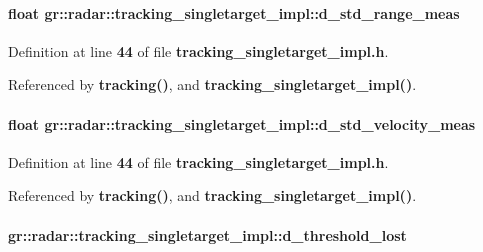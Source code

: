 \paragraph[{d\+\_\+std\+\_\+range\+\_\+meas}]{\setlength{\rightskip}{0pt plus 5cm}float gr\+::radar\+::tracking\+\_\+singletarget\+\_\+impl\+::d\+\_\+std\+\_\+range\+\_\+meas}\label{classgr_1_1radar_1_1tracking__singletarget__impl_afb33c64a630ce3decb7f6f9964e04223}


Definition at line {\bf 44} of file {\bf tracking\+\_\+singletarget\+\_\+impl.\+h}.



Referenced by {\bf tracking()}, and {\bf tracking\+\_\+singletarget\+\_\+impl()}.

\paragraph[{d\+\_\+std\+\_\+velocity\+\_\+meas}]{\setlength{\rightskip}{0pt plus 5cm}float gr\+::radar\+::tracking\+\_\+singletarget\+\_\+impl\+::d\+\_\+std\+\_\+velocity\+\_\+meas}\label{classgr_1_1radar_1_1tracking__singletarget__impl_aa113f1489ac2f93b5a7f84ad055d69e9}


Definition at line {\bf 44} of file {\bf tracking\+\_\+singletarget\+\_\+impl.\+h}.



Referenced by {\bf tracking()}, and {\bf tracking\+\_\+singletarget\+\_\+impl()}.

\paragraph[{d\+\_\+threshold\+\_\+lost}]{ gr\+::radar\+::tracking\+\_\+singletarget\+\_\+impl\+::d\+\_\+threshold\+\_\+lost}\label{classgr_1_1radar_1_1tracking__singletarget__impl_a06ae27534a27baddc2cd1feac1620557}


